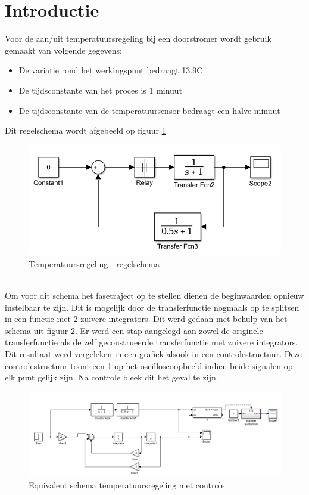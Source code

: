 \documentclass[12pt]{article}
\begin{document}
\section{Introductie}
Voor de aan/uit temperatuursregeling bij een doorstromer wordt gebruik gemaakt van volgende gegevens:
\begin{itemize}
	\item De variatie rond het werkingspunt bedraagt 13.9\degree C
	\item De tijdsconstante van het proces is 1 minuut
	\item De tijdsconstante van de temperatuursensor bedraagt een halve minuut
\end{itemize}
Dit regelschema wordt afgebeeld op figuur \ref{sys2}
\begin{figure}[!h]
	\includegraphics[width=\textwidth ,keepaspectratio]{systeem2.png}
	\centering
	\caption{Temperatuursregeling - regelschema}
	\label{sys2}
\end{figure} \\
Om voor dit schema het fasetraject op te stellen dienen de beginwaarden opnieuw instelbaar te zijn. Dit is mogelijk door de transferfunctie nogmaals op te splitsen in een functie met 2 zuivere integrators. Dit werd gedaan met behulp van het schema uit figuur \ref{schema2}. Er werd een stap aangelegd aan zowel de originele transferfunctie als de zelf geconstrueerde transferfunctie met zuivere integrators. Dit resultaat werd vergeleken in een grafiek alsook in een controlestructuur. Deze controlestructuur toont een 1 op het oscilloscoopbeeld indien beide signalen op elk punt gelijk zijn. Na controle bleek dit het geval te zijn.

\begin{figure}[!h]
	\includegraphics[width=\textwidth ,keepaspectratio]{schema2.png}
	\centering
	\caption{Equivalent schema temperatuursregeling met controle}
	\label{schema2}
\end{figure} 
\end{document}

